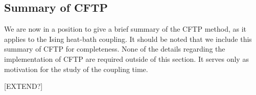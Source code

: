 	\subsection{Summary of CFTP}
	We are now in a position to give a brief summary of the CFTP method, as it applies to the Ising heat-bath coupling. It should be noted that we include this summary of CFTP for completeness. None of the details regarding the implementation of CFTP are required outside of this section. It serves only as motivation for the study of the coupling time.

	[EXTEND?]






